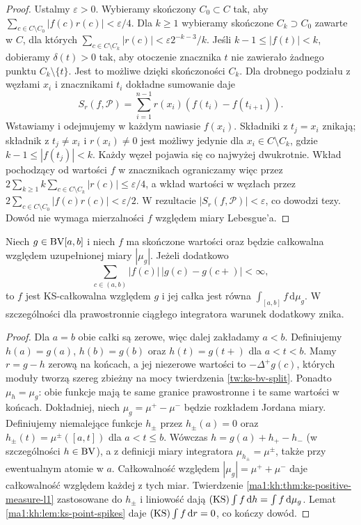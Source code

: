 \begin{proof}
Ustalmy $\varepsilon>0$. Wybieramy skończony $C_0\subset C$ tak, aby $\sum_{c\in C\setminus C_0}|f(c)r(c)|<\varepsilon/4$. Dla $k\ge1$ wybieramy skończone $C_k\supset C_0$ zawarte w $C$, dla których
$\sum_{c\in C\setminus C_k}|r(c)|<\varepsilon 2^{-k-3}/k$.
Jeśli $k-1\le |f(t)|<k$, dobieramy $\delta(t)>0$ tak, aby otoczenie znacznika $t$ nie zawierało żadnego punktu $C_k\setminus\{t\}$. Jest to możliwe dzięki skończoności $C_k$.
Dla drobnego podziału z węzłami $x_i$ i znacznikami $t_i$ dokładne sumowanie daje
\[
 S_r(f,\mathcal P)=\sum_{i=1}^{n-1}r(x_i)(f(t_i)-f(t_{i+1})).
\]
Wstawiamy i odejmujemy w każdym nawiasie $f(x_i)$. Składniki z $t_j=x_i$ znikają; składnik z $t_j\ne x_i$ i $r(x_i)\ne0$ jest możliwy jedynie dla $x_i\in C\setminus C_k$, gdzie $k-1\le |f(t_j)|<k$. Każdy węzeł pojawia się co najwyżej dwukrotnie. Wkład pochodzący od wartości $f$ w znacznikach ograniczamy więc przez
$2\sum_{k\ge1}k\sum_{c\in C\setminus C_k}|r(c)|\le\varepsilon/4$,
a wkład wartości w węzłach przez
$2\sum_{c\in C\setminus C_0}|f(c)r(c)|<\varepsilon/2$.
W rezultacie $|S_r(f,\mathcal P)|<\varepsilon$, co dowodzi tezy. Dowód nie wymaga mierzalności $f$ względem miary Lebesgue'a.
\end{proof}
\begin{twierdzenie}\label{ma1:kh:thm:ks-signed-measure-l1}
Niech $g\in\mathrm{BV}[a,b]$ i niech $f$ ma skończone wartości oraz będzie całkowalna względem uzupełnionej miary $|\mu_g|$. Jeżeli dodatkowo
\[
 \sum_{c\in(a,b)}|f(c)|\,|g(c)-g(c+)|<\infty,
\]
to $f$ jest KS-całkowalna względem $g$ i jej całka jest równa $\int_{[a,b]}f\,\mathrm d\mu_g$. W szczególności dla prawostronnie ciągłego integratora warunek dodatkowy znika.
\end{twierdzenie}
\begin{proof}
Dla $a=b$ obie całki są zerowe, więc dalej zakładamy $a<b$. Definiujemy $h(a)=g(a)$, $h(b)=g(b)$ oraz $h(t)=g(t+)$ dla $a<t<b$. Mamy $r=g-h$ zerową na końcach, a jej niezerowe wartości to $-\Delta^+g(c)$, których moduły tworzą szereg zbieżny na mocy twierdzenia \ref{tw:ks-bv-split}. Ponadto $\mu_h=\mu_g$: obie funkcje mają te same granice prawostronne i te same wartości w końcach. Dokładniej, niech $\mu_g=\mu^+-\mu^-$ będzie rozkładem Jordana miary. Definiujemy niemalejące funkcje $h_\pm$ przez $h_\pm(a)=0$ oraz $h_\pm(t)=\mu^\pm([a,t])$ dla $a<t\le b$. Wówczas $h=g(a)+h_+-h_-$ (w szczególności $h\in\mathrm{BV}$), a z definicji miary integratora $\mu_{h_\pm}=\mu^\pm$, także przy ewentualnym atomie w $a$. Całkowalność względem $|\mu_g|=\mu^++\mu^-$ daje całkowalność względem każdej z tych miar. Twierdzenie \ref{ma1:kh:thm:ks-positive-measure-l1} zastosowane do $h_\pm$ i liniowość dają $(\mathrm{KS})\int f\,\mathrm dh=\int f\,\mathrm d\mu_g$. Lemat \ref{ma1:kh:lem:ks-point-spikes} daje $(\mathrm{KS})\int f\,\mathrm dr=0$, co kończy dowód.
\end{proof}
